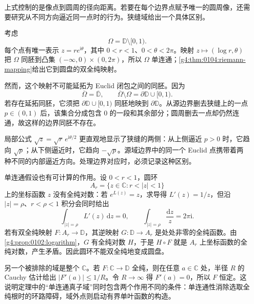 上式控制的是像点到圆周的径向距离。若要在每个边界点赋予唯一的圆周像，还需要研究从不同方向逼近同一点时的行为。狭缝域给出一个具体区别。

\begin{example}\label{g4:exm:0104:slit-boundary}
	考虑
	\[
		\Omega=\mathbb D\setminus[0,1).
	\]
	每个点有唯一表示 \(z=re^{\mathrm i\theta}\)，其中 \(0<r<1\)、\(0<\theta<2\pi\)。映射 \(z\mapsto(\log r,\theta)\) 把 \(\Omega\) 同胚到凸集 \((-\infty,0)\times(0,2\pi)\)，所以 \(\Omega\) 单连通；\cref{g4:thm:0104:riemann-mapping}给出它到圆盘的双全纯映射。

	然而，这个映射不可能延拓为 Euclid 闭包之间的同胚。因为
	\[
		\overline\Omega=\overline{\mathbb D},
		\qquad
		\overline\Omega\setminus\Omega=\partial\mathbb D\cup[0,1).
	\]
	若存在延拓同胚，它须把 \(\partial\mathbb D\cup[0,1)\) 同胚地映到 \(\partial\mathbb D\)。从源边界删去狭缝上的一点 \(p\in(0,1)\) 后，该集合分成包含 \(0\) 的一段和其余部分；圆周删去一点却仍然连通，故这样的边界同胚不存在。

	局部公式 \(\sqrt z=\sqrt r\,e^{\mathrm i\theta/2}\) 更直观地显示了狭缝的两侧：从上侧逼近 \(p>0\) 时，它趋向 \(\sqrt p\)；从下侧逼近时，它趋向 \(-\sqrt p\)。源域边界中的同一个 Euclid 点携带着两种不同的内部逼近方向。处理边界对应时，必须记录这种区别。
\end{example}

单连通假设也有可计算的作用。设 \(0<r<1\)，圆环
\[
	A_r=\{z\in\mathbb C:r<|z|<1\}
\]
上的坐标函数 \(z\) 没有全纯对数：若 \(e^{L(z)}=z\)，求导得 \(L'(z)=1/z\)，但沿 \(|z|=\rho\)、\(r<\rho<1\) 积分会同时给出
\[
	\int_{|z|=\rho}L'(z)\,\mathrm dz=0,
	\qquad
	\int_{|z|=\rho}\frac{\mathrm dz}{z}=2\pi\mathrm i.
\]
若有双全纯映射 \(F:A_r\to\mathbb D\)，其逆映射 \(G:\mathbb D\to A_r\) 是处处非零的全纯函数。由\cref{g4:prop:0102:logarithm}，\(G\) 有全纯对数 \(H\)，于是 \(H\circ F\) 就是 \(A_r\) 上坐标函数的全纯对数，产生矛盾。因此圆环不能双全纯地变成圆盘。

\ProseParagraphBreak

另一个被排除的域是整个 \(\mathbb C\)。若 \(F:\mathbb C\to\mathbb D\) 全纯，则在任意 \(a\in\mathbb C\) 处，半径 \(R\) 的 Cauchy 估计给出 \(|F'(a)|\le1/R\)。令 \(R\to\infty\) 得 \(F'(a)=0\)，所以 \(F\) 恒定。这说明定理中的“单连通真子域”同时包含两个作用不同的条件：单连通性消除选取全纯根时的环路障碍，域外点则启动有界单叶函数的构造。
